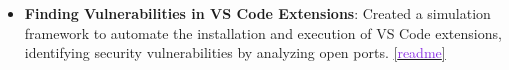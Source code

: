 \begin{itemize}
	\item \textbf{Finding Vulnerabilities in VS Code Extensions}: Created a simulation framework to automate the installation and execution of VS Code extensions, identifying security vulnerabilities by analyzing open ports.
	      \href{https://github.com/prateekdceit06/VSCode-Extensions-Simulator}{[\textcolor{blueviolet}{readme}]}

\end{itemize}





